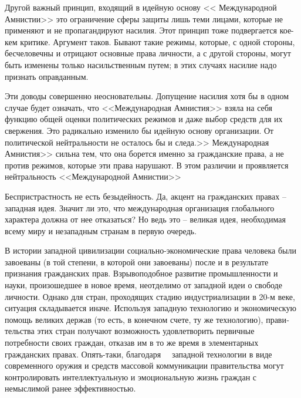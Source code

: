 \documentclass{book}
\begin{document}
Другой важный принцип, входящий в идейную основу << Меж­дународной Амнистии>> это ограничение сферы защиты лишь теми лицами, которые не применяют и не пропагандируют на­силия. Этот принцип тоже подвергается кое-кем критике. Ар­гумент таков. Бывают такие режимы, которые, с одной сторо­ны, бесчеловечны и отрицают основные права личности, а с другой стороны, могут быть изменены только насильственным путем; в этих случаях насилие надо признать оправданным.

Эти доводы совершенно неосновательны. Допущение насилия хотя бы в одном случае будет означать, что <<Международная Амнистия>> взяла на себя функцию общей оценки политических режимов и даже выбор средств для их свержения. Это ради­кально изменило бы идейную основу организации. От полити­ческой нейтральности не осталось бы и следа.>> Международная Амнистия>> сильна тем, что она борется именно за гражданские права,  а не против режимов,  которые эти права нарушают. В этом различии и проявляется нейтральность <<Международной Амнистии>>

Беспристрастность не есть безыдейность. Да, акцент на граж­данских правах -- западная идея. Значит ли это, что междуна­родная организация глобального характера должна от нее отка­заться? Но ведь это -- великая идея, необходимая всему миру и незападным странам в первую очередь.

В истории западной цивилизации социально-экономические права человека были завоеваны (в той степени, в которой они завоеваны) после и в результате признания гражданских прав. Взрывоподобное развитие промышленности и науки, произо­шедшее в новое время, неотделимо от западной идеи о сво­боде личности. Однако для стран, проходящих стадию инду­стриализации в 20-м веке, ситуация складывается иначе. Исполь­зуя западную технологию и экономическую помощь великих держав (то есть, в конечном счете, ту же технологию), прави­тельства этих стран получают возможность удовлетворить первичные потребности своих граждан, отказав им в то же время в элементарных гражданских правах. Опять-таки, благо­даря   западной технологии в виде современного оружия и средств массовой коммуникации правительства могут кон­тролировать интеллектуальную и эмоциональную жизнь граж­дан с немыслимой ранее эффективностью.
\end{document}
